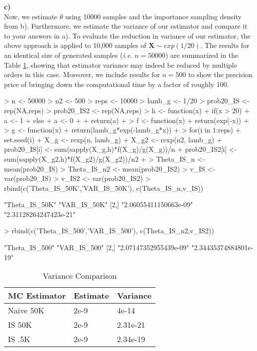 \documentclass{article}
\begin{document}
\vspace{10pt}
\textbf{c)} \\
Now, we estimate $\theta$ using 10000 samples and the importance sampling density from b). Furthermore, we estimate the variance of our estimator and compare it to your answers in a). To evaluate the reduction in variance of our estimator, the above approach is applied to 10,000 samples of $\mathbf{X}\sim exp(1/20)$. The results for an identical size of generated samples (\textit{i.e.} $n=50000$) are summarized in the Table \ref{tab:compar}, showing that estimator variance may indeed be reduced by multiple orders in this case. Moreover, we include results for $n=500$ to show the precision price of bringing down the computational time by a factor of roughly 100.
\begin{Schunk}
\begin{Sinput}
> n <- 50000  
> n2 <- 500  
> reps <- 10000 
> lamb_g <- 1/20 
> prob20_IS <- rep(NA,reps)
> prob20_IS2 <- rep(NA,reps)
> h <- function(x) { 
+   if(x > 20) {
+     a <- 1
+   } else {
+       a <- 0
+       }
+   return(a)
+ }
> f <- function(x) {
+   return(exp(-x)) 
+ }
> g <- function(x) {
+   return(lamb_g*exp(-lamb_g*x)) 
+ }
> for(i in 1:reps) {
+   set.seed(i)
+   X_g <- rexp(n, lamb_g)
+   X_g2 <- rexp(n2, lamb_g)
+   prob20_IS[i] <- sum(sapply(X_g,h)*f(X_g)/g(X_g))/n
+   prob20_IS2[i] <- sum(sapply(X_g2,h)*f(X_g2)/g(X_g2))/n2
+ }
> Theta_IS_n <- mean(prob20_IS)
> Theta_IS_n2 <- mean(prob20_IS2)
> v_IS <- var(prob20_IS)
> v_IS2 <- var(prob20_IS2)
> rbind(c('Theta_IS_50K','VAR_IS_50K'), c(Theta_IS_n,v_IS))
\end{Sinput}
\begin{Soutput}
     [,1]                   [,2]                  
[1,] "Theta_IS_50K"         "VAR_IS_50K"          
[2,] "2.06055411150663e-09" "2.31128264247423e-21"
\end{Soutput}
\begin{Sinput}
> rbind(c('Theta_IS_500','VAR_IS_500'), c(Theta_IS_n2,v_IS2))
\end{Sinput}
\begin{Soutput}
     [,1]                   [,2]                  
[1,] "Theta_IS_500"         "VAR_IS_500"          
[2,] "2.07147352955439e-09" "2.34435374884801e-19"
\end{Soutput}
\end{Schunk}


\begin{table}[]
\centering
\caption{Variance Comparison}
\label{tab:compar}
\begin{tabular}{lll}
\textbf{MC Estimator} & \textbf{Estimate}     & \textbf{Variance}\\ \hline
Naive 50K       & 2e-9                & 4e-14        \\
IS 50K       & 2e-9                & 2.31e-21        \\
IS .5K       & 2e-9                & 2.34e-19 
\end{tabular}
\end{table}
\end{document}
